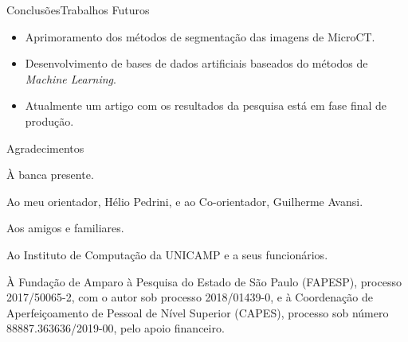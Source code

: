 \documentclass{beamer}
\begin{document}
\begin{frame}{Conclusões}{Trabalhos Futuros}
    \begin{itemize}
        \item Aprimoramento dos métodos de segmentação das imagens de MicroCT.
        \item Desenvolvimento de bases de dados artificiais baseados do métodos de \textit{Machine Learning}.
        \item Atualmente um artigo com os resultados da pesquisa está em fase final de produção.
    \end{itemize}
\end{frame}

\begin{frame}{Agradecimentos}
    \item À banca presente.
    \item Ao meu orientador, Hélio Pedrini, e ao Co-orientador, Guilherme Avansi.
    \item Aos amigos e familiares.
    \item Ao Instituto de Computação da UNICAMP e a seus funcionários.
    \item À Fundação de Amparo à Pesquisa do Estado de São Paulo (FAPESP), processo 2017/50065-2, com o autor sob processo 2018/01439-0, e à Coordenação de Aperfeiçoamento de Pessoal de Nível Superior (CAPES), processo sob número 88887.363636/2019-00, pelo apoio financeiro.
\end{frame}
\end{document}
